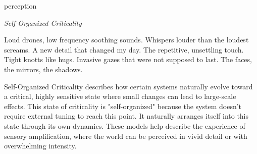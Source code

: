 

\begin{center}
\vspace*{\fill}
\Huge perception

\vspace{2cm}

\begin{flushright}
\large
\textit{Self-Organized Criticality}
\end{flushright}

\vspace*{\fill}
\end{center}

\normalsize

Loud drones, low frequency soothing sounds.
Whispers louder than the loudest screams. 
A new detail that changed my day. 
The repetitive, unsettling  touch.
Tight knotts like hugs. 
Invasive gazes that were not supposed to last.
The faces, the mirrors, the shadows. 


Self-Organized Criticality describes how certain systems naturally evolve toward a critical, highly sensitive state where small changes can lead to large-scale effects. This state of criticality is "self-organized" because the system doesn’t require external tuning to reach this point. It naturally arranges itself into this state through its own dynamics. These models help describe the experience of sensory amplification, where the world can be perceived in vivid detail or with overwhelming intensity. 